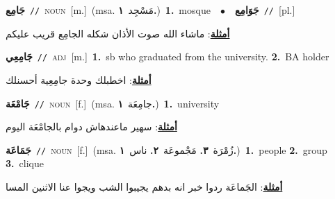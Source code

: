 \documentclass[10pt,a4paper,twoside]{article} %
\begin{document}
\begin{multicols}{2}
{\setlength\topsep{0pt}\textbf{\foreignlanguage{arabic}{جَامِع}}\ {\color{gray}\texttt{//}\color{black}}\ \textsc{noun}\ [m.]\ \color{gray}(msa. \foreignlanguage{arabic}{مَسْجِد}~\foreignlanguage{arabic}{\textbf{١.}})\color{black}\ \textbf{1.}~mosque\ \ $\bullet$\ \ \setlength\topsep{0pt}\textbf{\foreignlanguage{arabic}{جَوَامِع}}\ {\color{gray}\texttt{//}\color{black}}\ [pl.]\  \begin{flushright}\color{gray}\foreignlanguage{arabic}{\textbf{\underline{\foreignlanguage{arabic}{أمثلة}}}: ماشاء الله صوت الأذان شكله الجامِع قريب عليكم}\end{flushright}\color{black}} \vspace{2mm}

{\setlength\topsep{0pt}\textbf{\foreignlanguage{arabic}{جَامِعِي}}\ {\color{gray}\texttt{//}\color{black}}\ \textsc{adj}\ [m.]\ \textbf{1.}~sb who graduated from the university.  \textbf{2.}~BA holder\  \begin{flushright}\color{gray}\foreignlanguage{arabic}{\textbf{\underline{\foreignlanguage{arabic}{أمثلة}}}: اخطبلك وحدة جامِعِية أحسنلك}\end{flushright}\color{black}} \vspace{2mm}

{\setlength\topsep{0pt}\textbf{\foreignlanguage{arabic}{جَامْعَة}}\ {\color{gray}\texttt{//}\color{black}}\ \textsc{noun}\ [f.]\ \color{gray}(msa. \foreignlanguage{arabic}{جامِعَة}~\foreignlanguage{arabic}{\textbf{١.}})\color{black}\ \textbf{1.}~university\  \begin{flushright}\color{gray}\foreignlanguage{arabic}{\textbf{\underline{\foreignlanguage{arabic}{أمثلة}}}: سهير ماعندهاش دوام بالجامْعَة اليوم}\end{flushright}\color{black}} \vspace{2mm}

{\setlength\topsep{0pt}\textbf{\foreignlanguage{arabic}{جَمَاعَة}}\ {\color{gray}\texttt{//}\color{black}}\ \textsc{noun}\ [f.]\ \color{gray}(msa. \foreignlanguage{arabic}{زُمْرَة}~\foreignlanguage{arabic}{\textbf{٣.}}  \foreignlanguage{arabic}{مَجْموعَة}~\foreignlanguage{arabic}{\textbf{٢.}}  \foreignlanguage{arabic}{ناس}~\foreignlanguage{arabic}{\textbf{١.}})\color{black}\ \textbf{1.}~people  \textbf{2.}~group  \textbf{3.}~clique\  \begin{flushright}\color{gray}\foreignlanguage{arabic}{\textbf{\underline{\foreignlanguage{arabic}{أمثلة}}}: الجَماعَة ردوا خبر انه بدهم يجيبوا الشب ويجوا عنا الاثنين المسا}\end{flushright}\color{black}} \vspace{2mm}


\end{multicols}
\end{document}
